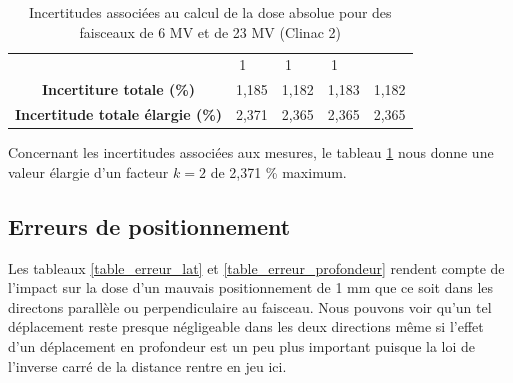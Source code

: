 \documentclass{article}
\begin{document}
\begin{table}[h]
\begin{tabular}{c|cccc|cccc|}
     &
    1 &
     &
    \multicolumn{1}{c|}{1} &
     &
    1 \\
  \multicolumn{1}{|c|}{\textbf{Incertiture totale (\%)}} &
    \multicolumn{2}{c|}{1,185} &
    \multicolumn{2}{c|}{1,182} &
    \multicolumn{2}{c|}{1,183} &
    \multicolumn{2}{c|}{1,182} \\ \hline
  \multicolumn{1}{|c|}{\textbf{Incertitude totale élargie (\%)}} &
    \multicolumn{2}{c|}{2,371} &
    \multicolumn{2}{c|}{2,365} &
    \multicolumn{2}{c|}{2,365} &
    \multicolumn{2}{c|}{2,365} \\ \hline
  \end{tabular}
  \caption{Incertitudes associées au calcul de la dose absolue pour des faisceaux de 6 MV et de 23 MV (Clinac 2)}
  \label{table_incertitudes_abs}
\end{table}

Concernant les incertitudes associées aux mesures, le tableau \ref*{table_incertitudes_abs} nous donne une valeur élargie d'un facteur $k=2$ de 2,371 \% maximum.

\subsection{Erreurs de positionnement}

Les tableaux \ref*{table_erreur_lat} et \ref*{table_erreur_profondeur} rendent compte de l'impact sur la dose d'un mauvais positionnement de 1 mm que ce soit dans les directons parallèle ou perpendiculaire au faisceau. Nous pouvons voir qu'un tel déplacement reste presque négligeable dans les deux directions même si l'effet d'un déplacement en profondeur est un peu plus important puisque la loi de l'inverse carré de la distance rentre en jeu ici.  
\end{document}
